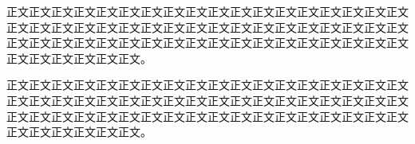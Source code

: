 \par
正文正文正文正文正文正文正文正文正文正文正文正文正文正文正文正文正文正文正文正文正文正文正文正文正文正文正文正文正文正文正文正文正文正文正文正文正文正文正文正文正文正文正文正文正文正文正文正文正文正文正文正文正文正文正文正文正文正文正文正文。

\par
正文正文正文正文正文正文正文正文正文正文正文正文正文正文正文正文正文正文正文正文正文正文正文正文正文正文正文正文正文正文正文正文正文正文正文正文正文正文正文正文正文正文正文正文正文正文正文正文正文正文正文正文正文正文正文正文正文正文正文正文。

